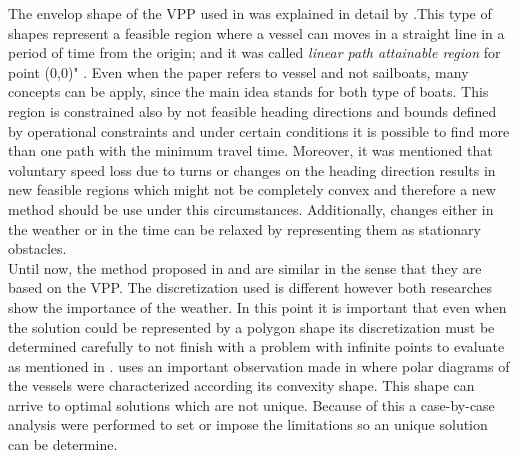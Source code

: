 The envelop shape of the VPP used in \cite{rabaudoptimal} was explained in detail by \cite{dolinskaya2009optimal}.This type of shapes represent a feasible region where a vessel can moves in a straight line in a period of time from the origin; and it was called     \textit{linear path attainable region} for point (0,0)" \cite{rabaudoptimal}. Even when the paper refers to vessel and not sailboats, many concepts can be apply, since the main idea stands for both type of boats.  This region is constrained also by not feasible heading directions  and bounds defined by operational constraints and under certain conditions it is possible to find more than one path with the minimum travel time. Moreover, it was mentioned that voluntary speed loss due to turns or changes on the heading direction results in new feasible regions which might not be completely convex and therefore a new method should be use under this circumstances. Additionally, changes either in the weather or in the time can be relaxed by representing them as stationary obstacles.\\
Until now,  the method proposed in  \cite{rabaudoptimal} and \cite{philpott1993yacht} are similar in the sense that they are based on the VPP. The discretization used is different however both researches show the importance of the weather.  In this point it is important that even when the solution could be represented by a polygon shape its discretization must be determined carefully to not finish with a problem with infinite points to evaluate as mentioned in \cite{mitchell2000geometric}.  \cite{rabaudoptimal} uses an important observation made in \cite{dolinskaya2013fastest} where polar diagrams of the vessels were characterized according its convexity shape. This shape can arrive to optimal solutions which are not unique. Because of this a  case-by-case analysis were performed to set  or impose the limitations so an unique solution can be determine.
